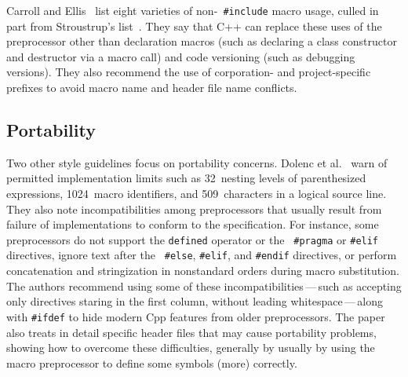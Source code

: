 \documentclass[10pt]{article}
\begin{document}
Carroll and Ellis~\cite{Carroll95} list eight varieties of non-{\tt
\#include} macro usage, culled in part from Stroustrup's
list~\cite{Stroustrup-DesignEvolution}.  They say that C++ can replace
these uses of the preprocessor other than declaration macros (such as
declaring a class constructor and destructor via a macro call) and code
versioning (such as debugging versions).  They also recommend the use of
corporation- and project-specific prefixes to avoid macro name and header
file name conflicts.


\subsection{Portability}

Two other style guidelines focus on portability concerns.
Dolenc et al.~\cite{Dolenc90} warn of permitted implementation limits such
as 32~nesting levels of parenthesized expressions, 1024~macro identifiers,
and 509~characters in a logical source line.  They also note
incompatibilities among preprocessors that usually result from failure of
implementations to conform to the specification.  For instance, some
preprocessors do not support the {\tt defined} operator or the {\tt
\#pragma} or {\tt \#elif} directives, ignore text after the {\tt
\#else}, {\tt \#elif}, and {\tt \#endif} directives, or perform
concatenation and stringization in nonstandard orders during macro
substitution.  The authors recommend using some of these
incompatibilities\,---\,such as accepting only directives staring in the
first column, without leading whitespace\,---\,along with {\tt \#ifdef} to
hide modern Cpp features from older preprocessors.  The paper also treats
in detail specific header files that may cause portability problems,
showing how to overcome these difficulties, generally by usually by using
the macro preprocessor to define some symbols (more) correctly.
\end{document}
